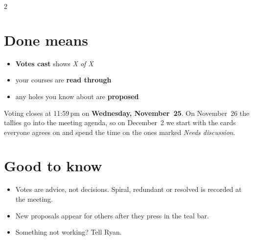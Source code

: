 \documentclass[10pt]{article}
\begin{document}
\begin{multicols}{2}
\section*{Done means}
\begin{itemize}
\item \textbf{Votes cast} shows \emph{X of X}
\item your courses are \textbf{read through}
\item any holes you know about are \textbf{proposed}
\end{itemize}
Voting closes at 11:59\,pm on \textbf{Wednesday, November~25}. On November~26 the tallies go into the
meeting agenda, so on December~2 we start with the cards everyone agrees on and spend the time on the
ones marked \emph{Needs discussion}.

\section*{Good to know}
\begin{itemize}
\item Votes are advice, not decisions. Spiral, redundant or resolved is recorded at the meeting.
\item New proposals appear for others after they press  in the teal bar.
\item Something not working? Tell Ryan.
\end{itemize}
\end{multicols}
\end{document}
